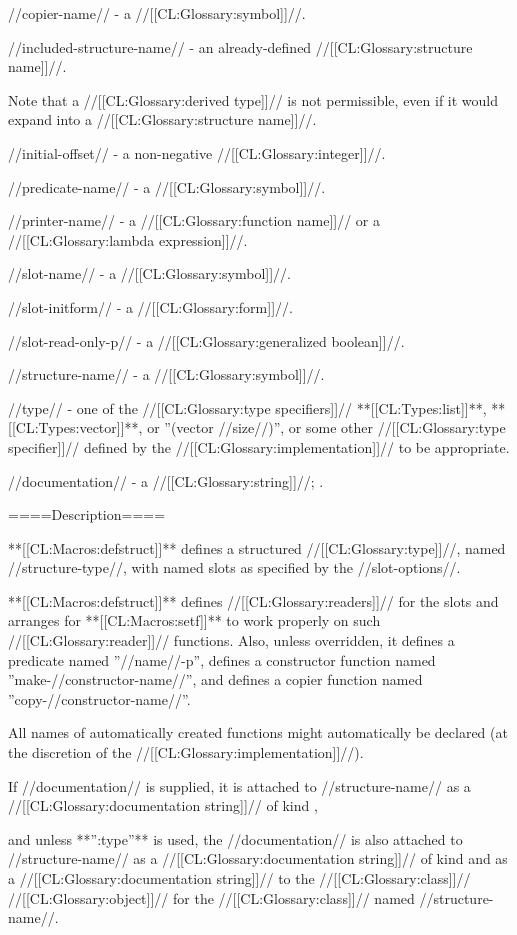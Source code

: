 //copier-name// - a //[[CL:Glossary:symbol]]//.

//included-structure-name// - an already-defined //[[CL:Glossary:structure name]]//.

Note that a //[[CL:Glossary:derived type]]// is not permissible, even if it would expand into a //[[CL:Glossary:structure name]]//.

//initial-offset// - a non-negative //[[CL:Glossary:integer]]//.

//predicate-name// - a //[[CL:Glossary:symbol]]//.

//printer-name// - a //[[CL:Glossary:function name]]// or a //[[CL:Glossary:lambda expression]]//.

//slot-name// - a //[[CL:Glossary:symbol]]//.

//slot-initform// - a //[[CL:Glossary:form]]//.

//slot-read-only-p// - a //[[CL:Glossary:generalized boolean]]//.

//structure-name// - a //[[CL:Glossary:symbol]]//.

//type// - one of the //[[CL:Glossary:type specifiers]]// **[[CL:Types:list]]**, **[[CL:Types:vector]]**, or ''(vector //size//)'', or some other //[[CL:Glossary:type specifier]]// defined by the //[[CL:Glossary:implementation]]// to be appropriate.

//documentation// - a //[[CL:Glossary:string]]//; \noeval.

====Description====

**[[CL:Macros:defstruct]]** defines a structured //[[CL:Glossary:type]]//, named //structure-type//, with named slots as specified by the //slot-options//.

**[[CL:Macros:defstruct]]** defines //[[CL:Glossary:readers]]// for the slots and arranges for **[[CL:Macros:setf]]** to work properly on such //[[CL:Glossary:reader]]// functions. Also, unless overridden, it defines a predicate named ''//name//-p'', defines a constructor function named ''make-//constructor-name//'', and defines a copier function named ''copy-//constructor-name//''.

All names of automatically created functions might automatically be declared  (at the discretion of the //[[CL:Glossary:implementation]]//).

If //documentation// is supplied, it is attached to //structure-name// as a //[[CL:Glossary:documentation string]]// of kind ,

and unless **'':type''** is used, the //documentation// is also attached to //structure-name// as a //[[CL:Glossary:documentation string]]// of kind  and as a //[[CL:Glossary:documentation string]]// to the //[[CL:Glossary:class]]// //[[CL:Glossary:object]]// for the //[[CL:Glossary:class]]// named //structure-name//.

